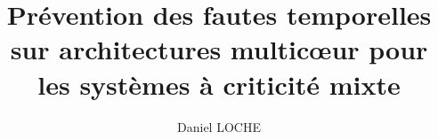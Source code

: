 %
%
%
% 
%


\usepackage[ED=EDSYS-SystEmb, Ets=INP]{tlsflyleaf}

\title{\textbf{\large Prévention des fautes temporelles sur architectures multicœur pour les systèmes à criticité mixte}}
\author{Daniel LOCHE}

